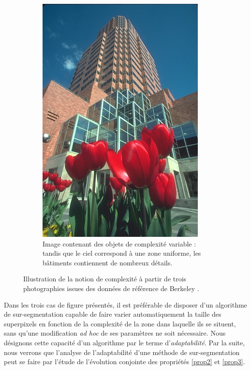 \begin{figure}[htb]
\begin{subfigure}[T]{0.45\textwidth}
			\includegraphics[width=\textwidth]{images/sur-segmentation/im_complexite_variable}
		 \caption{Image contenant des objets de complexité variable : tandis que le ciel correspond à une zone uniforme, les bâtiments contiennent de nombreux détails.  }
	\end{subfigure}
	\caption{Illustration de la notion de complexité à partir de trois photographies issues des données de référence de Berkeley \cite{MartinFTM01}.}
	\label{fig:sp_complexiteImage}
\end{figure}

Dans les trois cas de figure présentés, il est préférable de disposer d'un algorithme de sur-segmentation capable de faire varier automatiquement la taille des superpixels en fonction de la complexité de la zone dans laquelle ils se situent, sans qu'une modification \emph{ad hoc} de ses paramètres ne soit nécessaire. Nous désignons cette capacité d'un algorithme par le terme d'\emph{adaptabilité}. Par la suite, nous verrons que l'analyse de l'adaptabilité d'une méthode de sur-segmentation peut se faire par l'étude de l'évolution conjointe des propriétés \ref{prop2} et \ref{prop3}. 

